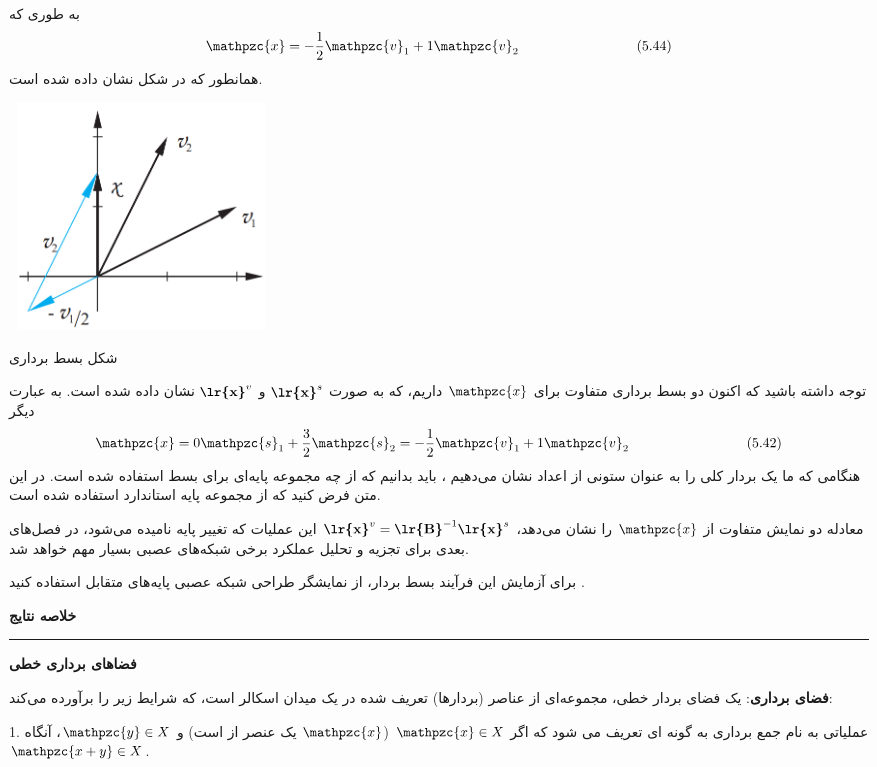 \documentclass[a4paper,12pt]{report}
\begin{document}
	   به طوری که	   
	   $$
	   \mathpzc{x}=-\frac{1}{2}\mathpzc{v}_1+1\mathpzc{v}_2 \hspace{3cm} (5.44)
	   $$
	   همانطور که در شکل  نشان داده شده است.
	   \begin{center}
	   		\includegraphics[width=7cm, height=6cm]{134}
	   		
	   		شکل  بسط برداری
	   \end{center}
   توجه داشته باشید که اکنون دو بسط برداری متفاوت برای $ \mathpzc{x} $ داریم، که به صورت
   	$ \textbf{\lr{x}}^s $
   	و
   	$ \textbf{\lr{x}}^v $
   	نشان داده شده است. به عبارت دیگر
   	$$
   	\mathpzc{x}=0\mathpzc{s}_1+\frac{3}{2}\mathpzc{s}_2=
   	-\frac{1}{2}\mathpzc{v}_1+1\mathpzc{v}_2 \hspace{3cm} (5.42)
   	$$
   	هنگامی که ما یک بردار کلی را به عنوان ستونی از اعداد نشان می‌دهیم ، باید بدانیم که از چه مجموعه پایه‌ای برای بسط استفاده شده است. در این متن فرض کنید که از مجموعه پایه استاندارد استفاده شده است.
   	
   	معادله  دو نمایش متفاوت از $ \mathpzc{x} $ را نشان می‌دهد،
   	$ \textbf{\lr{x}}^v=\textbf{\lr{B}}^{-1}\textbf{\lr{x}}^s $
   	این عملیات که تغییر پایه نامیده می‌شود، در فصل‌های بعدی برای تجزیه و تحلیل عملکرد برخی شبکه‌های عصبی بسیار مهم خواهد شد.
   
   	برای آزمایش این فرآیند بسط بردار، از نمایشگر طراحی شبکه عصبی پایه‌های متقابل استفاده کنید \textbf{}.
   	\vspace{10cm}
   	
   	\noindent\textbf{\Large{خلاصه نتایج}}
   	\hrule \vspace{0.3cm}
   	\textbf{\large{فضاهای برداری خطی}}
   	
   	\textbf{فضای برداری}:
   	 یک فضای بردار خطی، مجموعه‌ای از عناصر (بردارها) تعریف شده در یک میدان اسکالر است، که شرایط زیر را برآورده می‌کند:
   	
   	1.	عملیاتی به نام جمع برداری به گونه ای تعریف می شود که اگر
   	$ \mathpzc{x} \in X $ ($ \mathpzc{x} $
   	یک عنصر از  است) و
   	$ \mathpzc{y} \in X $،
   	آنگاه 
   	$ \mathpzc{x+y} \in X $.\\
   	
\end{document}
